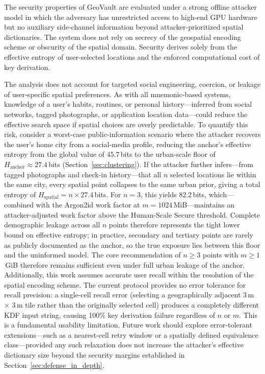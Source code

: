 \documentclass[mathematics,article,accept,pdftex,moreauthors]{Definitions/mdpi}
\begin{document}
The security properties of GeoVault are evaluated under a strong offline attacker model in which the adversary has unrestricted access to high-end GPU hardware but no auxiliary side-channel information beyond attacker-prioritized spatial dictionaries. The system does not rely on secrecy of the geospatial encoding scheme or obscurity of the spatial domain. Security derives solely from the effective entropy of user-selected locations and the enforced computational cost of key derivation.

The analysis does not account for targeted social engineering, coercion, or leakage of user-specific spatial preferences. As with all mnemonic-based systems, knowledge of a user's habits, routines, or personal history---inferred from social networks, tagged photographs, or application location data---could reduce the effective search space if spatial choices are overly predictable. {To quantify this risk, consider a worst-case public-information scenario where the attacker recovers the user's home city from a social-media profile, reducing the anchor's effective entropy from the global value of $45.7$\,bits to the urban-scale floor of $H_\text{anchor}\approx 27.4$\,bits (Section~\ref{sec:clustering}). If the attacker further infers---from tagged photographs and check-in history---that all $n$ selected locations lie within the same city, every spatial point collapses to the same urban prior, giving a total entropy of $H_\text{spatial} = n\times 27.4$\,bits. For $n=3$, this yields $82.2$\,bits, which---combined with the Argon2id work factor at $m=1024$\,MiB---maintains an attacker-adjusted work factor above the Human-Scale Secure threshold. Complete demographic leakage across all $n$ points therefore represents the tight lower bound on effective entropy; in practice, secondary and tertiary points are rarely as publicly documented as the anchor, so the true exposure lies between this floor and the uninformed model. The core recommendation of $n\geq 3$ points with $m\geq 1$\,GiB therefore remains sufficient even under full urban leakage of the anchor.} Additionally, this work assumes accurate user recall within the resolution of the spatial encoding scheme. %
{The current protocol provides no error tolerance for recall precision: a single-cell recall error (selecting a geographically adjacent 3\,m $\times$ 3\,m tile rather than the originally selected cell) produces a completely different KDF input string, causing 100\% key derivation failure regardless of $n$ or $m$. This is a fundamental usability limitation. Future work should explore error-tolerant extensions---such as a nearest-cell retry window or a spatially defined equivalence class---provided any such relaxation does not increase the attacker's effective dictionary size beyond the security margins established in Section~\ref{sec:defense_in_depth}.}
\end{document}
